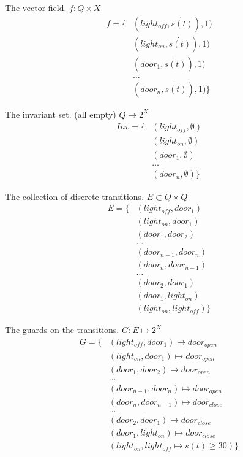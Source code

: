 \documentclass{article}
\begin{document}
The vector field.
$f: Q \times X$
\begin{align}
f = \{ & ( light_{off}, \dot{s(t)}), 1 ) \\
    & ( light_{on}, \dot{s(t)}), 1 ) \\
    & ( door_1, \dot{s(t)}), 1 ) \\
    & \ldots \\
    & ( door_n, \dot{s(t)}), 1 ) \}
\end{align}

The invariant set. (all empty)
$Q \mapsto 2^X$
\begin{align}
Inv = \{ & ( light_{off}, \emptyset ) \\
    & ( light_{on}, \emptyset ) \\
    & ( door_1, \emptyset ) \\
    & \ldots \\
    & ( door_n, \emptyset ) \}
\end{align}

The collection of discrete transitions.
$E \subset Q \times Q$
\begin{align}
E = \{ & ( light_{off}, door_1 ) \\
    & ( light_{on}, door_1 ) \\
    & ( door_1, door_2 ) \\
    & \ldots \\
    & ( door_{n-1}, door_n ) \\
    & ( door_n, door_{n-1} ) \\
    & \ldots \\
    & ( door_2, door_1 ) \\
    & ( door_1, light_{on} ) \\
    & ( light_{on}, light_{off} ) \}
\end{align}

The guards on the transitions.
$G: E \mapsto 2^X$
\begin{align}
G = \{ & ( light_{off}, door_1 ) \mapsto door_{open} \\
    & ( light_{on}, door_1 ) \mapsto door_{open} \\
    & ( door_1, door_2 ) \mapsto door_{open} \\
    & \ldots \\
    & ( door_{n-1}, door_n ) \mapsto door_{open} \\
    & ( door_n, door_{n-1} ) \mapsto door_{close} \\
    & \ldots \\
    & ( door_2, door_1 ) \mapsto door_{close} \\
    & ( door_1, light_{on} ) \mapsto door_{close} \\
    & ( light_{on}, light_{off} \mapsto s(t) \geq 30 ) \}
\end{align}
\end{document}
